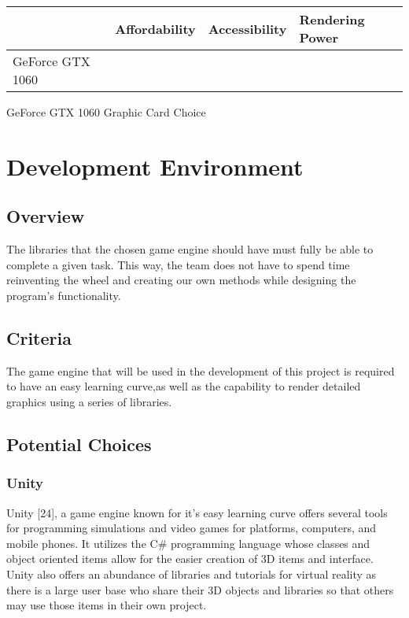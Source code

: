 \documentclass[letterpaper,10pt,onecolumn,compsoc]{IEEEtran}
\begin{document}

\begin{center}
\begin{tabular}{ | P{4.5cm} | P{3cm} | P{2.5cm} | P{3.5cm} | } 
 	\hline
 	 & Affordability & Accessibility & Rendering Power \\ 
 	\hline 		
 	GeForce GTX 1060 & \checkmark & \checkmark & \checkmark \\ 
 	\hline
\end{tabular}
\end{center}

\begin{center}
GeForce GTX 1060 Graphic Card Choice
\end{center}

\newpage

\section{Development Environment}

\subsection{Overview}
The libraries that the chosen game engine should have must fully be able to complete a given task. This way, the team does not have to spend time reinventing the wheel and creating our own methods while designing the program’s functionality.

\subsection{Criteria}
The game engine that will be used in the development of this project is required to have an easy learning curve,as well as the capability to render detailed graphics using a series of libraries.

\subsection{Potential Choices}

\subsubsection{Unity}
Unity [24], a game engine known for it’s easy learning curve offers several tools for programming simulations and video games for platforms, computers, and mobile phones. It utilizes the C\# programming language whose classes and object oriented items allow for the easier creation of 3D items and interface. Unity also offers an abundance of libraries and tutorials for virtual reality as there is a large user base who share their 3D objects and libraries so that others may use those items in their own project.
\end{document}
